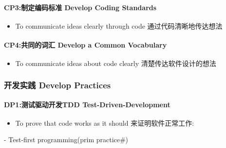 \hypertarget{cp3ux5236ux5b9aux7f16ux7801ux6807ux51c6-develop-coding-standards}{%
\paragraph{CP3:制定编码标准 Develop Coding
Standards}\label{cp3ux5236ux5b9aux7f16ux7801ux6807ux51c6-develop-coding-standards}}

\begin{itemize}
\tightlist
\item
  To communicate ideas clearly through code 通过代码清晰地传达想法
\end{itemize}

\hypertarget{cp4ux5171ux540cux7684ux8bcdux6c47-develop-a-common-vocabulary}{%
\paragraph{CP4:共同的词汇 Develop a Common
Vocabulary}\label{cp4ux5171ux540cux7684ux8bcdux6c47-develop-a-common-vocabulary}}

\begin{itemize}
\tightlist
\item
  To communicate ideas about code clearly 清楚传达软件设计的想法
\end{itemize}

\hypertarget{ux5f00ux53d1ux5b9eux8df5-develop-practices}{%
\subsubsection{开发实践 Develop
Practices}\label{ux5f00ux53d1ux5b9eux8df5-develop-practices}}

\hypertarget{dp1ux6d4bux8bd5ux9a71ux52a8ux5f00ux53d1tdd-test-driven-development}{%
\paragraph{DP1:测试驱动开发TDD
Test-Driven-Development}\label{dp1ux6d4bux8bd5ux9a71ux52a8ux5f00ux53d1tdd-test-driven-development}}

\begin{itemize}
\tightlist
\item
  To prove that code works as it should 来证明软件正常工作:\\
\end{itemize}

\begin{description}
\tightlist
\item[]
- Test-first programming(prim practice\#)
\end{description}

